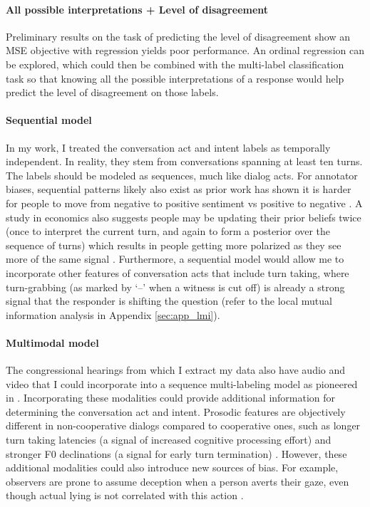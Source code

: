 \paragraph{All possible interpretations + Level of disagreement} Preliminary results on the task of predicting the level of disagreement show an MSE objective with regression yields poor performance. An ordinal regression can be explored, which could then be combined with the multi-label classification task so that knowing all the possible interpretations of a response would help predict the level of disagreement on those labels. 

\paragraph{Sequential model}
In my work, I treated the conversation act and intent labels as temporally independent. In reality, they stem from conversations spanning at least ten turns. The labels should be modeled as sequences, much like dialog acts. For annotator biases, sequential patterns likely also exist as prior work has shown it is harder for people to move from negative to positive sentiment vs positive to negative \cite{Boydstun:2019}. A study in economics also suggests people may be updating their prior beliefs twice (once to interpret the current turn, and again to form a posterior over the sequence of turns) which results in people getting more polarized as they see more of the same signal \cite{Fryer:2019}. Furthermore, a sequential model would allow me to incorporate other features of conversation acts that include turn taking, where turn-grabbing (as marked by `--' when a witness is cut off) is already a strong signal that the responder is shifting the question (refer to the local mutual information analysis in Appendix \ref{sec:app_lmi}). 


\paragraph{Multimodal model}
The congressional hearings from which I extract my data also have audio and video that I could incorporate into a sequence multi-labeling model as pioneered in \cite{Li:2010}. Incorporating these modalities could provide additional information for determining the conversation act and intent. Prosodic features are objectively different in non-cooperative dialogs compared to cooperative ones, such as longer turn taking latencies (a signal of increased cognitive processing effort) and stronger F0 declinations (a signal for early turn termination) \cite{Reichel:2018}. However, these additional modalities could also introduce new sources of bias. For example, observers are prone to assume deception when a person averts their gaze, even though actual lying is not correlated with this action \cite{Levine:2019}.

